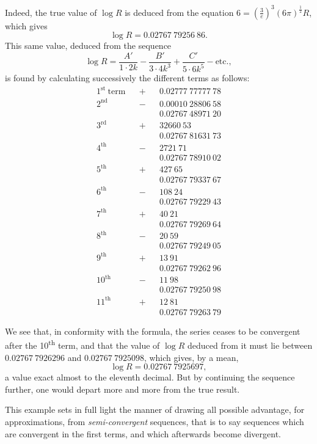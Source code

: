 \documentclass{article}
\begin{document}
Indeed, the true value of $\log R$ is deduced from the equation $6=\left(\frac{3}{e}\right)^{3}(6\pi)^{\frac{1}{2}}R$, which gives
\[ \log R=0.02767\ 79256\ 86. \]
This same value, deduced from the sequence
\[ \log R=\frac{A'}{1\cdot2k}-\frac{B'}{3\cdot4k^{3}}+\frac{C'}{5\cdot6k^{5}}-\text{etc.}, \]
is found by calculating successively the different terms as follows:
\[ \begin{aligned} 1^{\text{st}}\ \text{term} && + && 0.02777\ 77777\ 78\\ 2^{\text{nd}} && - && 0.00010\ 28806\ 58\\ && && 0.02767\ 48971\ 20\\ 3^{\text{rd}} && + && 32660\ 53\\ && && 0.02767\ 81631\ 73\\ 4^{\text{th}} && - && 2721\ 71\\ && && 0.02767\ 78910\ 02\\ 5^{\text{th}} && + && 427\ 65\\ && && 0.02767\ 79337\ 67\\ 6^{\text{th}} && - && 108\ 24\\ && && 0.02767\ 79229\ 43\\ 7^{\text{th}} && + && 40\ 21\\ && && 0.02767\ 79269\ 64\\ 8^{\text{th}} && - && 20\ 59\\ && && 0.02767\ 79249\ 05\\ 9^{\text{th}} && + && 13\ 91\\ && && 0.02767\ 79262\ 96\\ 10^{\text{th}} && - && 11\ 98\\ && && 0.02767\ 79250\ 98\\ 11^{\text{th}} && + && 12\ 81\\ && && 0.02767\ 79263\ 79 \end{aligned} \]


We see that, in conformity with the formula, the series ceases to be convergent after the 10\textsuperscript{th} term, and that the value of $\log R$ deduced from it must lie between $0.02767\ 7926296$ and $0.02767\ 7925098$, which gives, by a mean,
\[ \log R=0.02767\ 7925697, \]
a value exact almost to the eleventh decimal. But by continuing the sequence further, one would depart more and more from the true result.

This example sets in full light the manner of drawing all possible advantage, for approximations, from \emph{semi-convergent} sequences, that is to say sequences which are convergent in the first terms, and which afterwards become divergent.
\end{document}
